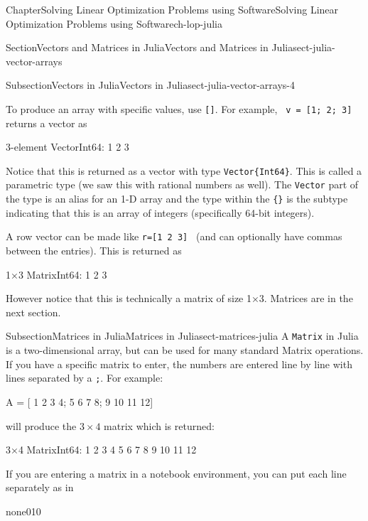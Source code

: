 \documentclass[oneside,10pt,]{book}
\newcommand{\mono}[1]{\texttt{#1}}
\numberwithin{equation}{section}
\begin{document}
\begin{chapterptx}{Chapter}{Solving Linear Optimization Problems using Software}{}{Solving Linear Optimization Problems using Software}{}{}{ch-lop-julia}
\begin{sectionptx}{Section}{Vectors and Matrices in Julia}{}{Vectors and Matrices in Julia}{}{}{sect-julia-vector-arrays}
\begin{subsectionptx}{Subsection}{Vectors in Julia}{}{Vectors in Julia}{}{}{sect-julia-vector-arrays-4}
\par
To produce an array with specific values, use \mono{[]}. For example, \mono{ v = [1; 2; 3]} returns a vector as%
\par
%
\begin{codedisplay}
3-element Vector{Int64}:
  1
  2
  3
\end{codedisplay}
%
\par
Notice that this is returned as a vector with type \mono{Vector\{Int64\}}. This is called a parametric type (we saw this with rational numbers as well). The \mono{Vector} part of the type is an alias for an 1-D array and the type within the \mono{\{\}} is the subtype indicating that this is an array of integers (specifically 64-bit integers).%
\par
A row vector can be made like \mono{r=[1 2 3] } (and can optionally have commas between the entries). This is returned as%
\par
%
\begin{codedisplay}
1×3 Matrix{Int64}:
 1  2  3
\end{codedisplay}
%
\par
However notice that this is technically a matrix of size 1×3. Matrices are in the next section.%
\end{subsectionptx}
%
%
\typeout{************************************************}
\typeout{************************************************}
%
\begin{subsectionptx}{Subsection}{Matrices in Julia}{}{Matrices in Julia}{}{}{sect-matrices-julia}
A \mono{Matrix} in Julia is a two-dimensional array, but can be used for many standard Matrix operations. If you have a specific matrix to enter, the numbers are entered line by line with lines separated by a \mono{;}. For example:%
\par
%
\begin{codedisplay}
A = [ 1 2 3 4; 5 6 7 8; 9 10 11 12]
\end{codedisplay}
%
\par
will produce the \(3 \times 4\) matrix which is returned:%
\par
%
\begin{codedisplay}
3×4 Matrix{Int64}:
 1   2   3   4
 5   6   7   8
 9  10  11  12
\end{codedisplay}
%
\par
If you are entering a matrix in a notebook environment, you can put each line separately as in%
\begin{program}{none}{0}{1}{0}

\end{program}
\end{subsectionptx}
\end{sectionptx}
\end{chapterptx}
\end{document}
